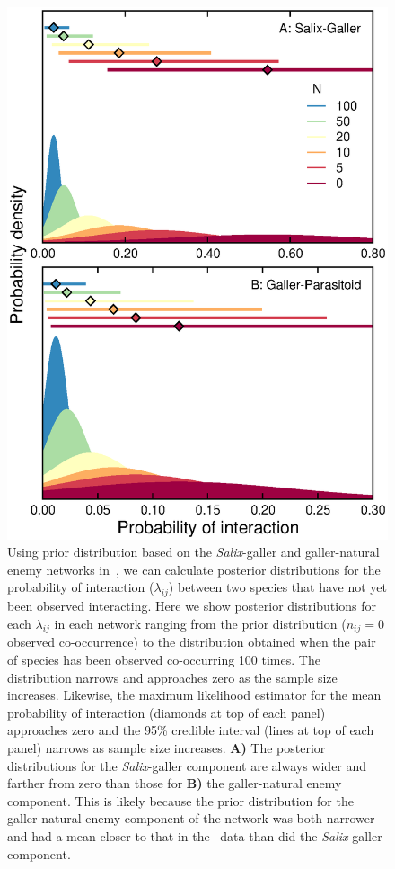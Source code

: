 \documentclass[12pt]{article}
\begin{document}
      \begin{figure}[h!]
        \caption{Using prior distribution based on the \emph{Salix}-galler and galler-natural enemy networks in~\citet{Barbour2016}, we can calculate posterior distributions for the probability of interaction ($\lambda_{ij}$) between two species that have not yet been observed interacting. Here we show posterior distributions for each $\lambda_{ij}$ in each network ranging from the prior distribution ($n_{ij}=0$ observed co-occurrence) to the distribution obtained when the pair of species has been observed co-occurring 100 times. The distribution narrows and approaches zero as the sample size increases. Likewise, the maximum likelihood estimator for the mean probability of interaction (diamonds at top of each panel) approaches zero and the 95\% credible interval (lines at top of each panel) narrows as sample size increases. \textbf{A)} The posterior distributions for the \emph{Salix}-galler component are always wider and farther from zero than those for \textbf{B)} the galler-natural enemy component. This is likely because the prior distribution for the galler-natural enemy component of the network was both narrower and had a mean closer to that in the~\citet{Kopelke2017} data than did the \emph{Salix}-galler component.}
        \label{Salix_pdfs}
        \begin{center}
        \includegraphics*[width=.65\textwidth]{figures/Salix_Galler_pdfs_increasing_N.eps}
        \end{center}
        \end{figure}
\end{document}
